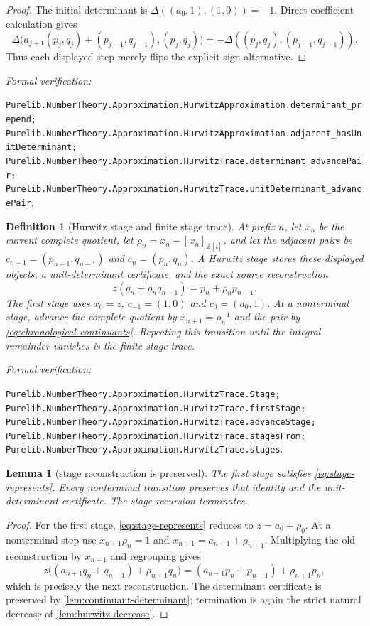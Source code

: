\documentclass[11pt]{article}
\newtheorem{lemma}[lemma]{Lemma}
\newtheorem{definition}[definition]{Definition}
\newcommand{\Zi}{\mathbb{Z}[i]}
\newcommand{\leanref}[1]{\par\smallskip\noindent
  \emph{Formal verification:}\par\nobreak
  {\raggedright\nolinkurl{#1}.\par}}
\begin{document}
\begin{proof}
The initial determinant is
$\Delta((a_0,1),(1,0))=-1$.  Direct coefficient calculation gives
\[
 \Delta\bigl(a_{j+1}(p_j,q_j)+(p_{j-1},q_{j-1}),
              (p_j,q_j)\bigr)
      =-\Delta((p_j,q_j),(p_{j-1},q_{j-1})).
\]
Thus each displayed step merely flips the explicit sign alternative.
\end{proof}

\leanref{Purelib.NumberTheory.Approximation.HurwitzApproximation.determinant_prepend;
Purelib.NumberTheory.Approximation.HurwitzApproximation.adjacent_hasUnitDeterminant;
Purelib.NumberTheory.Approximation.HurwitzTrace.determinant_advancePair;
Purelib.NumberTheory.Approximation.HurwitzTrace.unitDeterminant_advancePair}

\begin{definition}[Hurwitz stage and finite stage trace]
\label{def:full-hurwitz-stage}
At prefix $n$, let $x_n$ be the current complete quotient, let
$\rho_n=x_n-[x_n]_{\Zi}$, and let the adjacent pairs be
$c_{n-1}=(p_{n-1},q_{n-1})$ and $c_n=(p_n,q_n)$.  A \emph{Hurwitz stage}
stores these displayed objects, a unit-determinant certificate, and the exact
source reconstruction
\begin{equation}
\label{eq:stage-represents}
 z(q_n+\rho_nq_{n-1})=p_n+\rho_np_{n-1}.
\end{equation}
The first stage uses $x_0=z$, $c_{-1}=(1,0)$ and
$c_0=(a_0,1)$.  At a nonterminal stage, advance the complete quotient by
$x_{n+1}=\rho_n^{-1}$ and the pair by
\eqref{eq:chronological-continuants}.  Repeating this transition until the
integral remainder vanishes is the finite stage trace.
\end{definition}

\leanref{Purelib.NumberTheory.Approximation.HurwitzTrace.Stage;
Purelib.NumberTheory.Approximation.HurwitzTrace.firstStage;
Purelib.NumberTheory.Approximation.HurwitzTrace.advanceStage;
Purelib.NumberTheory.Approximation.HurwitzTrace.stagesFrom;
Purelib.NumberTheory.Approximation.HurwitzTrace.stages}

\begin{lemma}[stage reconstruction is preserved]
\label{lem:stage-reconstruction}
The first stage satisfies \eqref{eq:stage-represents}.  Every nonterminal
transition preserves that identity and the unit-determinant certificate.
The stage recursion terminates.
\end{lemma}

\begin{proof}
For the first stage, \eqref{eq:stage-represents} reduces to
$z=a_0+\rho_0$.  At a nonterminal step use
$x_{n+1}\rho_n=1$ and
$x_{n+1}=a_{n+1}+\rho_{n+1}$.  Multiplying the old reconstruction by
$x_{n+1}$ and regrouping gives
\[
 z\bigl((a_{n+1}q_n+q_{n-1})+\rho_{n+1}q_n\bigr)
 = (a_{n+1}p_n+p_{n-1})+\rho_{n+1}p_n,
\]
which is precisely the next reconstruction.  The determinant certificate is
preserved by \cref{lem:continuant-determinant}; termination is again the
strict natural decrease of \cref{lem:hurwitz-decrease}.
\end{proof}
\end{document}
